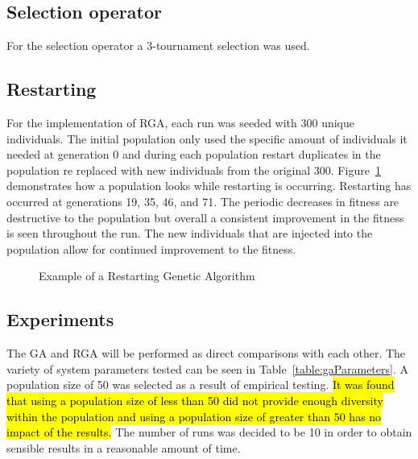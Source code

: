 \documentclass[conference]{IEEEtran}
\begin{document}
\subsection{Selection operator}

For the selection operator a 3-tournament selection was used.

\subsection{Restarting}
\label{subsec:restarting}

For the implementation of RGA, each run was seeded with 300 unique individuals. The initial population only used the specific amount of individuals it needed at generation 0 and during each population restart duplicates in the population re replaced with new individuals from the original 300. Figure~\ref{fig:bestRunRestarting} demonstrates how a population looks while restarting is occurring. Restarting has occurred at generations 19, 35, 46, and 71. The periodic decreases in fitness are destructive to the population but overall a consistent improvement in the fitness is seen throughout the run. The new individuals that are injected into the population allow for continued improvement to the fitness.

\begin{figure}
\begin{center}
\end{center}
\caption{Example of a Restarting Genetic Algorithm}
\label{fig:bestRunRestarting}
\end{figure}

\subsection{Experiments}

The GA and RGA will be performed as direct comparisons with each other. The variety of system parameters tested can be seen in Table~\ref{table:gaParameters}. A population size of 50 was selected as a result of empirical testing. \hl{It was found that using a population size of less than 50 did not provide enough diversity within the population and using a population size of greater than 50 has no impact of the results.} The number of runs was decided to be 10 in order to obtain sensible results in a reasonable amount of time.
\end{document}
